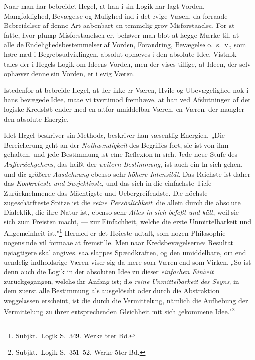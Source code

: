 \documentclass[12pt]{book}
\newcommand{\apage}[1]{\marginnote{\footnotesize\textit{[#1]}}}
\begin{document}
Naar man har bebreidet Hegel, at han i sin Logik har lagt Vorden, Mangfoldighed, Bevægelse og
Mulighed ind i det evige Væsen, da forraade Bebreidelser af denne Art aabenbart en temmelig grov
Misforstaaelse. For at fatte, hvor plump Misforstaaelsen er, behøver man blot at lægge Mærke til, at
alle de Endelighedsbestemmelser af Vorden, Forandring, Bevægelse o.\ s.\ v., som høre med i
Begrebsudviklingen, absolut ophæves i den absolute Idee. Vistnok tales der i Hegels Logik om Ideens
Vorden, men der vises tillige, at Ideen, der selv ophæver denne sin Vorden, er i evig \apage{448} Væren.

Istedenfor at bebreide Hegel, at der ikke er Væren, Hvile og Ubevægelighed nok i hans bevægede Idee,
maae vi tvertimod fremhæve, at han ved Afslutningen af det logiske Kredsløb ender med en altfor
umiddelbar Væren, en Væren, der mangler den absolute Energie.

Idet Hegel beskriver sin Methode, beskriver han væsentlig Energien. „Die Bereicherung geht an der
\emph{Nothwendigkeit} des Begriffes fort, sie ist von ihm gehalten, und jede Bestimmung ist eine
Reflexion in sich. Jede neue Stufe des \emph{Außersichgehens}, das heißt der \emph{weitern
Bestimmung}, ist auch ein In-sich-gehen, und die größere \emph{Ausdehnung} ebenso sehr \emph{höhere
Intensität}. Das Reichste ist daher das \emph{Konkreteste und Subjektivste}, und das sich in die
einfachste Tiefe Zurücknehmende das Mächtigste und Uebergreifendste. Die höchste zugeschärfteste
Spitze ist die \emph{reine Persönlichkeit}, die allein durch die absolute Dialektik, die ihre Natur
ist, ebenso sehr \emph{Alles in sich befaßt und hält}, weil sie sich zum Freisten macht, — zur
Einfachheit, welche die erste Unmittelbarkeit und Allgemeinheit ist."\footnote{Subjkt.\ Logik S.~349.
Werke 5ter Bd.} Hermed er det Høieste udtalt, som nogen Philosophie nogensinde vil formaae at %
fremstille. Men naar Kredsbevægelsernes Resultat nøiagtigere skal angives, saa slappes Spændkraften,
og den umiddelbare, om end uendelig indholdsrige Væren viser sig da mere som Væren end som Virken. „So
ist denn auch die Logik in der absoluten Idee zu dieser \emph{einfachen Einheit} zurückgegangen,
welche ihr Anfang ist; die \emph{reine Unmittelbarkeit des Seyns}, in dem zuerst alle Bestimmung als
ausgelöscht oder durch die Abstraktion weggelassen erscheint, ist die durch die Vermittelung, nämlich
die Aufhebung der Vermittelung zu ihrer entsprechenden Gleichheit mit sich gekommene
Idee."\footnote{Subjkt.\ Logik S.~351--52. Werke 5ter Bd.}
\end{document}
